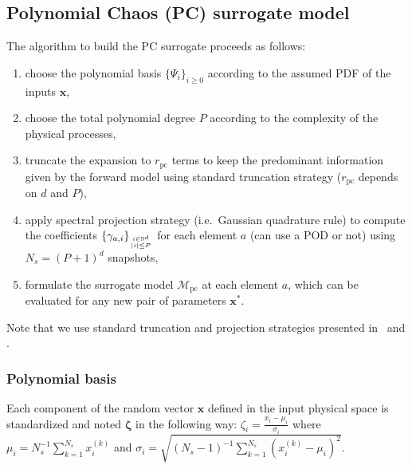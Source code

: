 \subsection{Polynomial Chaos (PC) surrogate model}\label{sec:PC}

The algorithm to build the PC surrogate proceeds as follows:
\begin{enumerate}
\item choose the polynomial basis $\lbrace\Psi_{i}\rbrace_{i\geq 0}$ according to the assumed PDF of the inputs $\mathbf{x}$,
\item choose the total polynomial degree $P$ according to the complexity of the physical processes,
\item truncate the expansion to $r_{\text{pc}}$ terms to keep the predominant information given by the forward model using standard truncation strategy ($r_{\text{pc}}$ depends on $d$ and $P$),
\item apply spectral projection strategy (i.e.~Gaussian quadrature rule) to compute the coefficients $\lbrace\gamma_{a,i}\rbrace_{i\in\mathbb{N}^d\atop|i|\leq P}$ for each element $a$ (can use a POD or not) using $N_{s} = (P+1)^{d}$ snapshots,
\item formulate the surrogate model $\mathcal{M}_{\text{pc}}$ at each element $a$, which can be evaluated for any new pair of parameters $\mathbf{x}^*$.
\end{enumerate}
Note that we use standard truncation and projection strategies presented in~\cite{lemaitreknio2010} and \cite{xiu2010}.

\subsubsection{Polynomial basis}

Each component of the random vector $\mathbf{x}$ defined in the input physical space is standardized and noted $\boldsymbol{\zeta}$ in the following way: $\zeta_i=\frac{x_i-\mu_i}{\sigma_i}$ where $\mu_i=N_{s}^{-1}\sum_{k=1}^{N_{s}}x_i^{(k)}$ and $\sigma_i=\sqrt{(N_{s}-1)^{-1}\sum_{k=1}^{N_{s}}\left(x_i^{(k)}-\mu_i\right)^2}$. 


